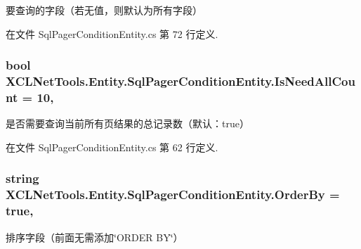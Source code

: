 要查询的字段（若无值，则默认为所有字段） 



在文件 Sql\-Pager\-Condition\-Entity.\-cs 第 72 行定义.

\hypertarget{class_x_c_l_net_tools_1_1_entity_1_1_sql_pager_condition_entity_ae14dfee7db160c5c894201e014cc1ce0}{
\subsubsection[{Is\-Need\-All\-Count}]{\setlength{\rightskip}{0pt plus 5cm}bool X\-C\-L\-Net\-Tools.\-Entity.\-Sql\-Pager\-Condition\-Entity.\-Is\-Need\-All\-Count = 10\hspace{0.3cm}{\ttfamily [get]}, {\ttfamily [set]}}}\label{class_x_c_l_net_tools_1_1_entity_1_1_sql_pager_condition_entity_ae14dfee7db160c5c894201e014cc1ce0}


是否需要查询当前所有页结果的总记录数（默认：true） 



在文件 Sql\-Pager\-Condition\-Entity.\-cs 第 62 行定义.

\hypertarget{class_x_c_l_net_tools_1_1_entity_1_1_sql_pager_condition_entity_a311a6c9cbb127ec03d11e8211dc42e37}{
\subsubsection[{Order\-By}]{\setlength{\rightskip}{0pt plus 5cm}string X\-C\-L\-Net\-Tools.\-Entity.\-Sql\-Pager\-Condition\-Entity.\-Order\-By = true\hspace{0.3cm}{\ttfamily [get]}, {\ttfamily [set]}}}\label{class_x_c_l_net_tools_1_1_entity_1_1_sql_pager_condition_entity_a311a6c9cbb127ec03d11e8211dc42e37}


排序字段（前面无需添加\char`\"{}\-O\-R\-D\-E\-R B\-Y\char`\"{}） 



